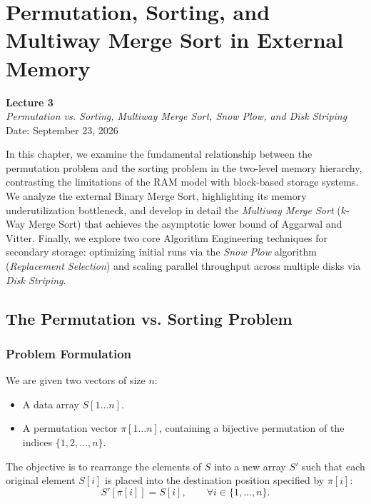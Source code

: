 \chapter{Permutation, Sorting, and Multiway Merge Sort in External Memory}
\label{cha:lecture-three}

\begin{center}
  \textbf{Lecture 3}\\
  \emph{Permutation vs. Sorting, Multiway Merge Sort, Snow Plow, and Disk Striping}\\[0.5em]
  Date: September 23, 2026
\end{center}

In this chapter, we examine the fundamental relationship between the permutation problem and the sorting problem in the two-level memory hierarchy, contrasting the limitations of the RAM model with block-based storage systems. We analyze the external Binary Merge Sort, highlighting its memory underutilization bottleneck, and develop in detail the \textit{Multiway Merge Sort} ($k$-Way Merge Sort) that achieves the asymptotic lower bound of Aggarwal and Vitter. Finally, we explore two core Algorithm Engineering techniques for secondary storage: optimizing initial runs via the \textit{Snow Plow} algorithm (\textit{Replacement Selection}) and scaling parallel throughput across multiple disks via \textit{Disk Striping}.


\section{The Permutation vs. Sorting Problem}
\label{sec:permutation-vs-sorting}

\subsection{Problem Formulation}
\label{subsec:problem-formulation}

We are given two vectors of size $n$:
\begin{itemize}
  \item A data array $S[1 \dots n]$.
  \item A permutation vector $\pi[1 \dots n]$, containing a bijective permutation of the indices $\{1, 2, \dots, n\}$.
\end{itemize}

The objective is to rearrange the elements of $S$ into a new array $S'$ such that each original element $S[i]$ is placed into the destination position specified by $\pi[i]$:
\begin{equation}
  S'[\pi[i]] = S[i], \qquad \forall i \in \{1, \dots, n\}.
\end{equation}

